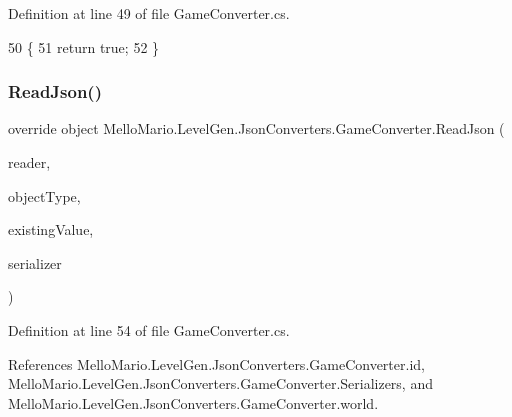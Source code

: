 Definition at line 49 of file Game\+Converter.\+cs.


\begin{DoxyCode}
50         \{
51             \textcolor{keywordflow}{return} \textcolor{keyword}{true};
52         \}
\end{DoxyCode}
\mbox{\label{classMelloMario_1_1LevelGen_1_1JsonConverters_1_1GameConverter_a1ab5cd39e850c96e0ca41ac6be8d97fe}} 
\subsubsection{Read\+Json()}
{\footnotesize\ttfamily override object Mello\+Mario.\+Level\+Gen.\+Json\+Converters.\+Game\+Converter.\+Read\+Json (\begin{DoxyParamCaption}\item[{Json\+Reader}]{reader,  }\item[{Type}]{object\+Type,  }\item[{object}]{existing\+Value,  }\item[{Json\+Serializer}]{serializer }\end{DoxyParamCaption})}



Definition at line 54 of file Game\+Converter.\+cs.



References Mello\+Mario.\+Level\+Gen.\+Json\+Converters.\+Game\+Converter.\+id, Mello\+Mario.\+Level\+Gen.\+Json\+Converters.\+Game\+Converter.\+Serializers, and Mello\+Mario.\+Level\+Gen.\+Json\+Converters.\+Game\+Converter.\+world.


